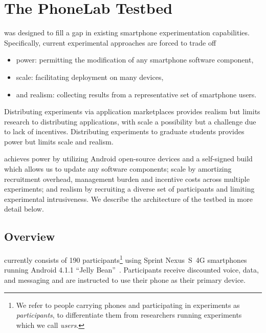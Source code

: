 \clearpage

\section{The PhoneLab Testbed}
\label{sec-testbed}

\PhoneLab{} was designed to fill a gap in existing smartphone experimentation
capabilities. Specifically, current experimental approaches are forced to
trade off

\begin{itemize}[nosep]
\vspace*{0.08in}
\item power: permitting the modification of any smartphone software component,
\item scale: facilitating deployment on many devices,
\item and realism: collecting results from a representative set of smartphone users.
\vspace*{0.08in}
\end{itemize}

Distributing experiments via application marketplaces provides realism but
limits research to distributing applications, with scale a possibility but a
challenge due to lack of incentives. Distributing experiments to graduate
students provides power but limits scale and realism.

\PhoneLab{} achieves power by utilizing Android open-source devices and a
self-signed build which allows us to update any software components; scale by
amortizing recruitment overhead, management burden and incentive costs across
multiple experiments; and realism by recruiting a diverse set of participants
and limiting experimental intrusiveness. We describe the architecture of the
\PhoneLab{} testbed in more detail below.

\subsection{Overview}

\PhoneLab{} currently consists of 190 participants\footnote{We refer to
people carrying \PhoneLab{} phones and participating in experiments as
\PhoneLab{} \textit{participants}, to differentiate them from researchers
running \PhoneLab{} experiments which we call \textit{users}.} using Sprint
Nexus~S~4G smartphones~\cite{FIXME-nexuss4g} running Android 4.1.1 ``Jelly
Bean''~\cite{FIXME-jellybean}. Participants receive discounted voice, data,
and messaging and are instructed to use their \PhoneLab{} phone as their
primary device.

